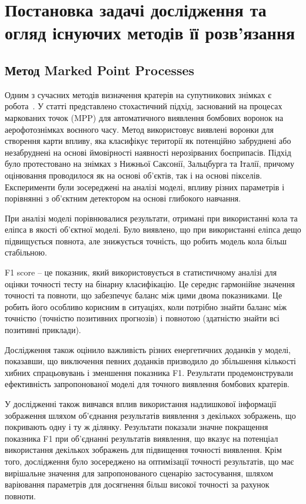 
\chapter{Постановка задачі дослідження та огляд існуючих методів її розв'язання}
\label{chap:review}  %

\section{Метод Marked Point Processes}

Одним з сучасних методів визначення кратерів на супутникових
знімках є робота~\cite{mpp2022}. У статті представлено
стохастичний підхід, заснований на процесах маркованих
точок (MPP) для автоматичного виявлення бомбових
воронок на аерофотознімках воєнного часу. Метод
використовує виявлені воронки для створення карти
впливу, яка класифікує території як потенційно забруднені
або незабруднені на основі ймовірності наявності
нерозірваних боєприпасів. Підхід було протестовано
на знімках з Нижньої Саксонії, Зальцбурга та Італії,
причому оцінювання проводилося як на основі об'єктів,
так і на основі пікселів. Експерименти були зосереджені
на аналізі моделі, впливу різних параметрів і порівнянні
з об'єктним детектором на основі глибокого навчання.

При аналізі моделі порівнювалися результати, отримані
при використанні кола та еліпса в якості об'єктної моделі.
Було виявлено, що при використанні еліпса дещо підвищується
повнота, але знижується точність, що робить
модель кола більш стабільною.

F1 score -- це показник, який використовується в статистичному аналізі для
оцінки точності тесту на бінарну класифікацію. Це середнє гармонійне значення
точності та повноти, що забезпечує баланс між цими двома показниками. Це робить
його особливо корисним в ситуаціях, коли потрібно знайти баланс між точністю
(точністю позитивних прогнозів) і повнотою (здатністю знайти всі позитивні
приклади).

Дослідження також оцінило важливість різних енергетичних доданків у моделі,
показавши, що виключення певних доданків призводило
до збільшення кількості хибних спрацьовувань і зменшення
показника F1. Результати продемонстрували ефективність
запропонованої моделі для точного виявлення бомбових кратерів.

У дослідженні також вивчався вплив використання надлишкової
інформації зображення шляхом об'єднання результатів виявлення
з декількох зображень, що покривають одну і ту ж ділянку.
Результати показали значне покращення показника F1 при
об'єднанні результатів виявлення, що вказує на потенціал
використання декількох зображень для підвищення точності
виявлення. Крім того, дослідження було зосереджено на
оптимізації точності результатів, що має вирішальне
значення для запропонованого сценарію застосування,
шляхом варіювання параметрів для досягнення більш високої
точності за рахунок повноти.

